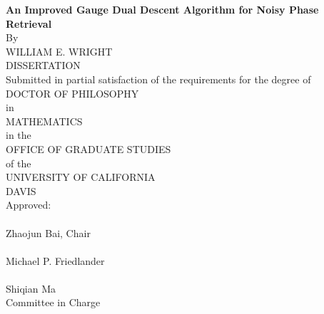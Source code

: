 \begin{center}
   \null\vfill
   \textbf{%
      An Improved Gauge Dual Descent Algorithm for Noisy Phase Retrieval
   }%
   \\
   \bigskip
   By \\
   \bigskip
   WILLIAM E. WRIGHT \\
   \bigskip
   DISSERTATION \\
   \bigskip
   Submitted in partial satisfaction of the requirements for the
   degree of \\
   \bigskip
   DOCTOR OF PHILOSOPHY \\
   \bigskip
   in \\
   \bigskip
   MATHEMATICS \\
   \bigskip
   in the \\
   \bigskip
   OFFICE OF GRADUATE STUDIES \\
   \bigskip        
   of the \\
   \bigskip
   UNIVERSITY OF CALIFORNIA \\
   \bigskip
   DAVIS \\
   \bigskip
   Approved: \\
   \bigskip
   \bigskip
   \makebox[3in]{\hrulefill} \\
   Zhaojun Bai, Chair \\
   \bigskip
   \bigskip
   \makebox[3in]{\hrulefill} \\
   Michael P. Friedlander \\
   \bigskip
   \bigskip
   \makebox[3in]{\hrulefill} \\
   Shiqian Ma  \\
   \bigskip
   Committee in Charge \\
    \\
   \vfill
\end{center}
